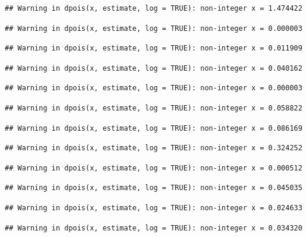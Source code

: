 \documentclass[]{article}
\begin{document}
\begin{verbatim}
## Warning in dpois(x, estimate, log = TRUE): non-integer x = 1.474422
\end{verbatim}

\begin{verbatim}
## Warning in dpois(x, estimate, log = TRUE): non-integer x = 0.000003
\end{verbatim}

\begin{verbatim}
## Warning in dpois(x, estimate, log = TRUE): non-integer x = 0.011909
\end{verbatim}

\begin{verbatim}
## Warning in dpois(x, estimate, log = TRUE): non-integer x = 0.040162
\end{verbatim}

\begin{verbatim}
## Warning in dpois(x, estimate, log = TRUE): non-integer x = 0.000003
\end{verbatim}

\begin{verbatim}
## Warning in dpois(x, estimate, log = TRUE): non-integer x = 0.058822
\end{verbatim}

\begin{verbatim}
## Warning in dpois(x, estimate, log = TRUE): non-integer x = 0.086169
\end{verbatim}

\begin{verbatim}
## Warning in dpois(x, estimate, log = TRUE): non-integer x = 0.324252
\end{verbatim}

\begin{verbatim}
## Warning in dpois(x, estimate, log = TRUE): non-integer x = 0.000512
\end{verbatim}

\begin{verbatim}
## Warning in dpois(x, estimate, log = TRUE): non-integer x = 0.045035
\end{verbatim}

\begin{verbatim}
## Warning in dpois(x, estimate, log = TRUE): non-integer x = 0.024633
\end{verbatim}

\begin{verbatim}
## Warning in dpois(x, estimate, log = TRUE): non-integer x = 0.034320
\end{verbatim}
\end{document}
